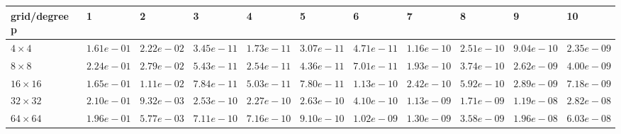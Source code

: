 \begin{tabular}{lllllllllll}
\hline
 grid/degree p   & 1          & 2          & 3          & 4          & 5          & 6          & 7          & 8          & 9          & 10         \\
\hline
 $4 \times 4$    & $1.61e-01$ & $2.22e-02$ & $3.45e-11$ & $1.73e-11$ & $3.07e-11$ & $4.71e-11$ & $1.16e-10$ & $2.51e-10$ & $9.04e-10$ & $2.35e-09$ \\
 $8 \times 8$    & $2.24e-01$ & $2.79e-02$ & $5.43e-11$ & $2.54e-11$ & $4.36e-11$ & $7.01e-11$ & $1.93e-10$ & $3.74e-10$ & $2.62e-09$ & $4.00e-09$ \\
 $16 \times 16$  & $1.65e-01$ & $1.11e-02$ & $7.84e-11$ & $5.03e-11$ & $7.80e-11$ & $1.13e-10$ & $2.42e-10$ & $5.92e-10$ & $2.89e-09$ & $7.18e-09$ \\
 $32 \times 32$  & $2.10e-01$ & $9.32e-03$ & $2.53e-10$ & $2.27e-10$ & $2.63e-10$ & $4.10e-10$ & $1.13e-09$ & $1.71e-09$ & $1.19e-08$ & $2.82e-08$ \\
 $64 \times 64$  & $1.96e-01$ & $5.77e-03$ & $7.11e-10$ & $7.16e-10$ & $9.10e-10$ & $1.02e-09$ & $1.30e-09$ & $3.58e-09$ & $1.96e-08$ & $6.03e-08$ \\
\hline
\end{tabular}